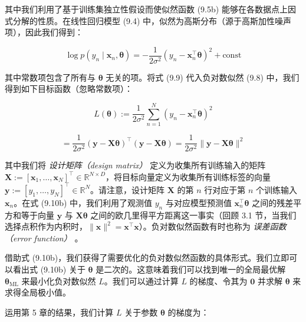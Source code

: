 其中我们利用了基于训练集独立性假设而使似然函数 (9.5b) 能够在各数据点上因式分解的性质。在线性回归模型 (9.4) 中，似然为高斯分布（源于高斯加性噪声项），因此我们得到：

\begin{equation}
\log p(y_n \mid \boldsymbol{x}_n, \boldsymbol{\theta}) = -\frac{1}{2\sigma^2}(y_n - \boldsymbol{x}_n^\top \boldsymbol{\theta})^2 + \text{const}
\tag{9.9}
\end{equation}

其中常数项包含了所有与 $ \boldsymbol{\theta} $ 无关的项。将式 (9.9) 代入负对数似然 (9.8) 中，我们得到如下目标函数（忽略常数项）：

\begin{equation}
L(\boldsymbol{\theta}) := \frac{1}{2\sigma^2}\sum_{n=1}^N (y_n - \boldsymbol{x}_n^\top \boldsymbol{\theta})^2
\tag{9.10a}
\end{equation}

\begin{equation}
= \frac{1}{2\sigma^2}(\boldsymbol{y} - \boldsymbol{X}\boldsymbol{\theta})^\top(\boldsymbol{y} - \boldsymbol{X}\boldsymbol{\theta}) = \frac{1}{2\sigma^2}\|\boldsymbol{y} - \boldsymbol{X}\boldsymbol{\theta}\|^2
\tag{9.10b}
\end{equation}

其中我们将 \emph{设计矩阵（design matrix）} 定义为收集所有训练输入的矩阵 $ \boldsymbol{X} := [\boldsymbol{x}_1, \ldots, \boldsymbol{x}_N]^\top \in \mathbb{R}^{N \times D} $，将目标向量定义为收集所有训练标签的向量 $ \boldsymbol{y} := [y_1, \ldots, y_N]^\top \in \mathbb{R}^N $。请注意，设计矩阵 $ \boldsymbol{X} $ 的第 $ n $ 行对应于第 $ n $ 个训练输入 $ \boldsymbol{x}_n $。在式 (9.10b) 中，我们利用了观测值 $ y_n $ 与对应模型预测值 $ \boldsymbol{x}_n^\top \boldsymbol{\theta} $ 之间的残差平方和等于向量 $ \boldsymbol{y} $ 与 $ \boldsymbol{X}\boldsymbol{\theta} $ 之间的欧几里得平方距离这一事实（回顾 3.1 节，当我们选择点积作为内积时，$ \|\boldsymbol{x}\|^2 = \boldsymbol{x}^\top \boldsymbol{x} $）。负对数似然函数有时也称为 \emph{误差函数（error function）} 。

借助式 (9.10b)，我们获得了需要优化的负对数似然函数的具体形式。我们立即可以看出式 (9.10b) 关于 $ \boldsymbol{\theta} $ 是二次的。这意味着我们可以找到唯一的全局最优解 $ \boldsymbol{\theta}_{\text{ML}} $ 来最小化负对数似然 $ L $。我们可以通过计算 $ L $ 的梯度、令其为 $ \boldsymbol{0} $ 并求解 $ \boldsymbol{\theta} $ 来求得全局极小值。

运用第 5 章的结果，我们计算 $ L $ 关于参数 $ \boldsymbol{\theta} $ 的梯度为：


